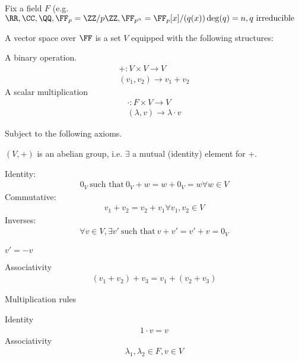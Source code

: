 \documentclass[class=scrartcl, crop=false]{standalone}
\begin{document}
\begin{definition}
  Fix a field $F$ (e.g. $\RR, \CC, \QQ, \FF_p = \ZZ / p \ZZ, \FF_{p^n} = \FF_p[x] / (q(x)) \deg(q) = n, q \text{ irreducible}$ 

  A vector space over $\FF$ is a set $V$ equipped with the following structures:
  \begin{enumerate}
    \ii
    A binary operation.
    \begin{gather*}
      +: V \times V \to V \\
      (v_1, v_2) \to v_1 + v_2
    \end{gather*} 
    \ii
    A scalar multiplication
    \begin{gather*}
      \cdot: F \times V \to V \\
      (\lambda, v) \to \lambda \cdot v
    \end{gather*} 
  \end{enumerate} 
  Subject to the following axioms.
  \begin{enumerate}
    \ii
    $(V, +)$ is an abelian group, i.e. $\exists$ a mutual (identity) element for +.
    \begin{enumerate}
      \ii Identity:
      \begin{gather*}
        0_V \ \text{such that} \ 0_V + w = w + 0_V = w \forall w \in V
      \end{gather*} 
      \ii Commutative:
      \begin{gather*}
        v_1 + v_2 = v_2 + v_1 \forall v_1, v_2 \in V
      \end{gather*} 
      \ii Inverses:
      \begin{gather*}
        \forall v \in V, \exists v' \ \text{such that} \ v + v' = v' + v = 0_V
      \end{gather*} 
      \begin{note}
        $v' = -v$
      \end{note} 
      \ii Associativity
      \begin{gather*}
        (v_1 + v_2) + v_3 = v_1 + (v_2 + v_3)
      \end{gather*} 
    \end{enumerate} 
    \ii
    Multiplication rules
    \begin{enumerate}
      Identity
      \begin{gather*}
        1 \cdot v = v
      \end{gather*} 
      \ii
      Associativity
      \begin{gather*}
        \lambda_1, \lambda_2 \in F, v \in V \\

\end{gather*}
\end{enumerate}
\end{enumerate}
\end{definition}
\end{document}
